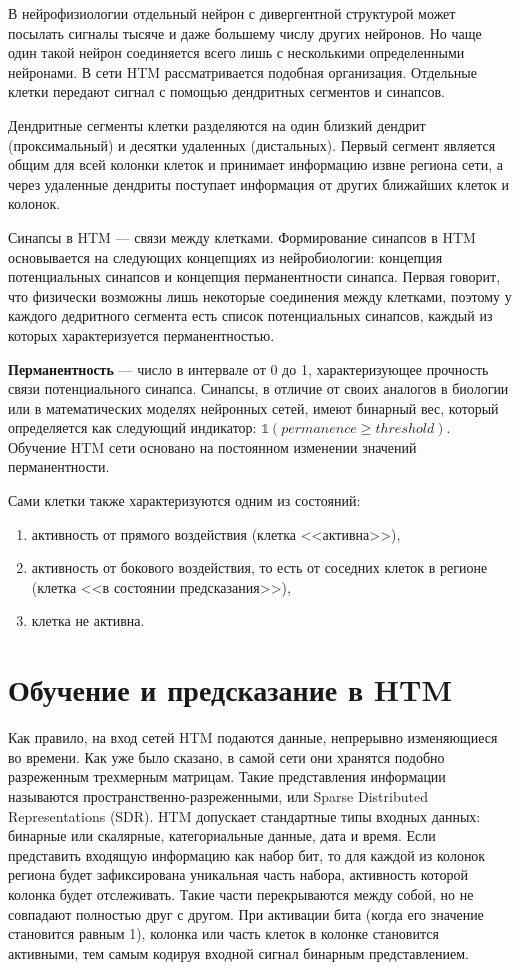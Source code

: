 В нейрофизиологии отдельный нейрон с дивергентной структурой может посылать сигналы тысяче и даже большему числу других нейронов. Но чаще один такой нейрон соединяется всего лишь с несколькими определенными нейронами. \cite{bloom} 
В сети HTM рассматривается подобная организация. Отдельные клетки передают сигнал с помощью дендритных сегментов и синапсов. 

Дендритные сегменты клетки разделяются на один близкий дендрит (проксимальный) и десятки удаленных (дистальных). Первый сегмент является общим для всей колонки клеток и принимает информацию извне региона сети, а через удаленные дендриты поступает информация от других ближайших клеток и колонок.

Синапсы в HTM --- связи между клетками. Формирование синапсов в HTM основывается на следующих концепциях из нейробиологии: концепция потенциальных синапсов и концепция перманентности синапса. Первая говорит, что физически возможны лишь некоторые соединения между клетками, поэтому у каждого дедритного сегмента есть список потенциальных синапсов, каждый из которых характеризуется перманентностью. 

\textbf{Перманентность} --- число в интервале от 0 до 1, характеризующее прочность связи потенциального синапса. Синапсы, в отличие от своих аналогов в биологии или в математических моделях нейронных сетей, имеют бинарный вес, который определяется как следующий индикатор: $\mathbb{1} \left( permanence \ge threshold \right)$. Обучение HTM сети основано на постоянном изменении значений перманентности. 

Сами клетки также характеризуются одним из состояний: 
\begin{enumerate}
\item активность от прямого воздействия (клетка <<активна>>),
\item активность от бокового воздействия, то есть от соседних клеток в регионе (клетка <<в состоянии предсказания>>),
\item клетка не активна. 
\end{enumerate}

\section{Обучение и предсказание в HTM}
Как правило, на вход сетей HTM подаются данные, непрерывно изменяющиеся во времени. Как уже было сказано, в самой сети они хранятся подобно разреженным трехмерным матрицам. Такие представления информации называются пространственно-разреженными, или Sparse Distributed Representations (SDR). \cite{htm_documentation} HTM допускает стандартные типы входных данных: бинарные или скалярные, категориальные данные, дата и время. Если представить входящую информацию как набор бит, то для каждой из колонок региона будет зафиксирована уникальная часть набора, активность которой колонка будет отслеживать. Такие части перекрываются между собой, но не совпадают полностью друг с другом. При активации бита (когда его значение становится равным 1), колонка или часть клеток в колонке становится активными, тем самым кодируя входной сигнал бинарным представлением.

